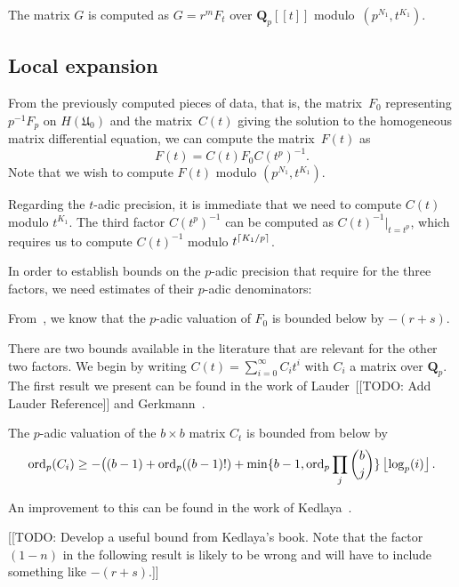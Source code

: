 The matrix $G$ is computed as $G = r^m F_t$ over $\mathbf{Q}_p[[t]]$ 
modulo~$(p^{N_1}, t^{K_1})$.

\subsection{Local expansion}

From the previously computed pieces of data, that is, the 
matrix~$F_0$ representing $p^{-1} F_p$ on $H(\mathfrak{U}_0)$ 
and the matrix~$C(t)$ giving the solution to the homogeneous 
matrix differential equation, we can compute the matrix~$F(t)$ 
as 
\begin{equation} \label{eq:genfrob}
F(t) = C(t) F_0 C(t^p)^{-1}.
\end{equation}
Note that we wish to compute $F(t)$ modulo $(p^{N_1}, t^{K_1})$.

Regarding the $t$-adic precision, it is immediate that we 
need to compute $C(t)$ modulo $t^{K_1}$.  The third factor 
$C(t^p)^{-1}$ can be computed as $C(t)^{-1} \vert_{t=t^p}$, 
which requires us to compute $C(t)^{-1}$ modulo $t^{\left\lceil K_1 / p\right\rceil}$.

In order to establish bounds on the $p$-adic precision 
that require for the three factors, we need estimates of 
their $p$-adic denominators:

From~\citep[Lemma~3.3]{Gerkmann2007}, we know that the $p$-adic 
valuation of $F_0$ is bounded below by $-(r+s)$.

There are two bounds available in the literature that are 
relevant for the other two factors.  We begin by writing 
$C(t) = \sum_{i=0}^{\infty} C_i t^i$ with $C_i$ a matrix 
over $\mathbf{Q}_p$.  The first result we present can be 
found in the work of Lauder~[[TODO: Add Lauder Reference]] 
and Gerkmann~\citep[Theorem~5.1]{Gerkmann2007}.

\begin{thm}
The $p$-adic valuation of the $b \times b$ matrix $C_t$ is 
bounded from below by 
\begin{equation*}
\operatorname{ord}_p(C_i) \geq - \bigl( (b-1) + \operatorname{ord}_p((b-1)!) + 
    \min\{b-1,\operatorname{ord}_p \prod_j \binom{b}{j}\} \left\lfloor\log_p(i)\right\rfloor.
\end{equation*}
\end{thm}

An improvement to this can be found in the work of 
Kedlaya~\citep[Theorem~18.3.3]{Kedlaya2010}.

[[TODO:  Develop a useful bound from Kedlaya's book.  Note that 
the factor $(1 - n)$ in the following result is likely to be 
wrong and will have to include something like $-(r + s)$.]]

